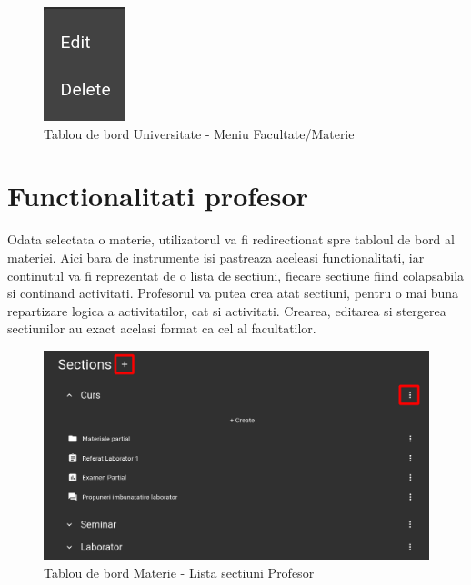 \documentclass[12pt, a4paper, oneside, romanian]{teza-upb}
\begin{document}
\begin{figure}[H]
\centering
\includegraphics*[width=0.15\columnwidth]{tablou-de-bord-universitate-meniu-facultate}
\caption{Tablou de bord Universitate - Meniu Facultate/Materie}
\label{tablou-de-bord-universitate-meniu-facultate}
\end{figure}



\section{Functionalitati profesor}

Odata selectata o materie, utilizatorul va fi redirectionat spre tabloul de bord al materiei. Aici bara de instrumente isi pastreaza aceleasi functionalitati, iar continutul va fi reprezentat de o lista de sectiuni, fiecare sectiune fiind colapsabila si continand activitati. Profesorul va putea crea atat sectiuni, pentru o mai buna repartizare logica a activitatilor, cat si activitati. Crearea, editarea si stergerea sectiunilor au exact acelasi format ca cel al facultatilor.

\begin{figure}[H]
\centering
\includegraphics*[width=\columnwidth]{tablou-de-bord-materie-lista-sectiuni-profesor}
\caption{Tablou de bord Materie - Lista sectiuni Profesor}
\label{tablou-de-bord-materie-lista-sectiuni-profesor}
\end{figure}
\end{document}
